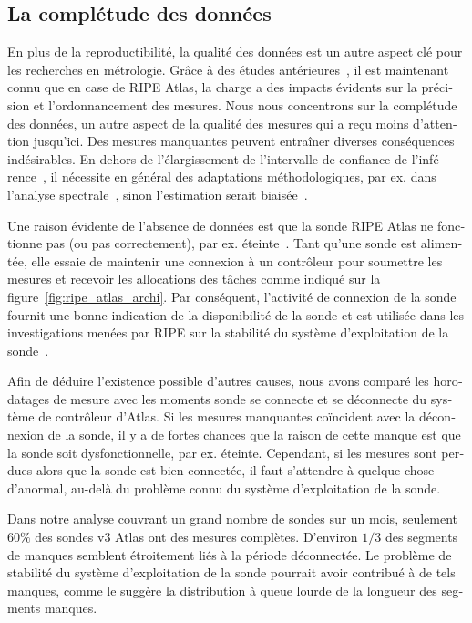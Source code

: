 \begin{otherlanguage}{french}
\subsection{La complétude des données}

En plus de la reproductibilité, la qualité des données est un autre aspect clé pour les recherches en métrologie.
Grâce à des études antérieures~\cite{Holterbach2015a, Bajpai2015}, il est maintenant connu que en case de RIPE Atlas, la charge a des impacts évidents sur la précision et l'ordonnancement des mesures.
Nous nous concentrons sur la complétude des données, un autre aspect de la qualité des mesures qui a reçu moins d'attention jusqu'ici. 
Des mesures manquantes peuvent entraîner diverses conséquences indésirables.
En dehors de l'élargissement de l'intervalle de confiance de l'inférence~\cite{Fontugne2016}, 
il nécessite en général des adaptations méthodologiques, par ex. dans l'analyse spectrale~\cite{Babu2010, Luckie2014, shao2016}, 
sinon l'estimation serait biaisée~\cite {Baraldi2010}.

Une raison évidente de l'absence de données est que la sonde RIPE Atlas ne fonctionne pas (ou pas correctement), par ex. éteinte~\cite{schedule}.
Tant qu'une sonde est alimentée, elle essaie de maintenir une connexion à un contrôleur pour soumettre les mesures et recevoir les allocations des tâches comme indiqué sur la figure~\ref{fig:ripe_atlas_archi}.
Par conséquent, l'activité de connexion de la sonde fournit une bonne indication de la disponibilité de la sonde et est utilisée dans les investigations menées par RIPE sur la stabilité du système d'exploitation de la sonde~\cite{1look, 2look, 3look}.

Afin de déduire l'existence possible d'autres causes, nous avons comparé les horodatages de mesure avec les moments sonde se connecte et se déconnecte du système de contrôleur d'Atlas.
Si les mesures manquantes coïncident avec la déconnexion de la sonde, il y a de fortes chances que la raison de cette manque est que la sonde soit dysfonctionnelle, par ex. éteinte.
Cependant, si les mesures sont perdues alors que la sonde est bien connectée, il faut s'attendre à quelque chose d'anormal, au-delà du problème connu du système d'exploitation de la sonde.

Dans notre analyse couvrant un grand nombre de sondes sur un mois, seulement $60\%$ des sondes v3 Atlas ont des mesures complètes. 
D'environ $1/3$ des segments de manques semblent étroitement liés à la période déconnectée. 
Le problème de stabilité du système d'exploitation de la sonde pourrait avoir contribué à de tels manques, 
comme le suggère la distribution à queue lourde de la longueur des segments manques.


\end{otherlanguage}
